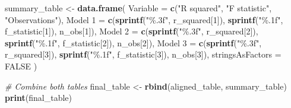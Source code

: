 \documentclass[
]{article}
\newenvironment{Shaded}{\begin{snugshade}}{\end{snugshade}}
\newcommand{\AttributeTok}[1]{\textcolor[rgb]{0.13,0.29,0.53}{#1}}
\newcommand{\CommentTok}[1]{\textcolor[rgb]{0.56,0.35,0.01}{\textit{#1}}}
\newcommand{\ConstantTok}[1]{\textcolor[rgb]{0.56,0.35,0.01}{#1}}
\newcommand{\DecValTok}[1]{\textcolor[rgb]{0.00,0.00,0.81}{#1}}
\newcommand{\FunctionTok}[1]{\textcolor[rgb]{0.13,0.29,0.53}{\textbf{#1}}}
\newcommand{\NormalTok}[1]{#1}
\newcommand{\OtherTok}[1]{\textcolor[rgb]{0.56,0.35,0.01}{#1}}
\newcommand{\StringTok}[1]{\textcolor[rgb]{0.31,0.60,0.02}{#1}}
\begin{document}
\begin{Shaded}
\begin{Highlighting}[]
\NormalTok{summary\_table }\OtherTok{\textless{}{-}} \FunctionTok{data.frame}\NormalTok{(}
  \AttributeTok{Variable =} \FunctionTok{c}\NormalTok{(}\StringTok{"R squared"}\NormalTok{, }\StringTok{"F statistic"}\NormalTok{, }\StringTok{"Observations"}\NormalTok{),}
  \StringTok{\textasciigrave{}}\AttributeTok{Model 1}\StringTok{\textasciigrave{}} \OtherTok{=} \FunctionTok{c}\NormalTok{(}\FunctionTok{sprintf}\NormalTok{(}\StringTok{"\%.3f"}\NormalTok{, r\_squared[}\DecValTok{1}\NormalTok{]), }\FunctionTok{sprintf}\NormalTok{(}\StringTok{"\%.1f"}\NormalTok{, f\_statistic[}\DecValTok{1}\NormalTok{]), n\_obs[}\DecValTok{1}\NormalTok{]),}
  \StringTok{\textasciigrave{}}\AttributeTok{Model 2}\StringTok{\textasciigrave{}} \OtherTok{=} \FunctionTok{c}\NormalTok{(}\FunctionTok{sprintf}\NormalTok{(}\StringTok{"\%.3f"}\NormalTok{, r\_squared[}\DecValTok{2}\NormalTok{]), }\FunctionTok{sprintf}\NormalTok{(}\StringTok{"\%.1f"}\NormalTok{, f\_statistic[}\DecValTok{2}\NormalTok{]), n\_obs[}\DecValTok{2}\NormalTok{]),}
  \StringTok{\textasciigrave{}}\AttributeTok{Model 3}\StringTok{\textasciigrave{}} \OtherTok{=} \FunctionTok{c}\NormalTok{(}\FunctionTok{sprintf}\NormalTok{(}\StringTok{"\%.3f"}\NormalTok{, r\_squared[}\DecValTok{3}\NormalTok{]), }\FunctionTok{sprintf}\NormalTok{(}\StringTok{"\%.1f"}\NormalTok{, f\_statistic[}\DecValTok{3}\NormalTok{]), n\_obs[}\DecValTok{3}\NormalTok{]),}
  \AttributeTok{stringsAsFactors =} \ConstantTok{FALSE}
\NormalTok{)}

\CommentTok{\# Combine both tables}
\NormalTok{final\_table }\OtherTok{\textless{}{-}} \FunctionTok{rbind}\NormalTok{(aligned\_table, summary\_table)}
\FunctionTok{print}\NormalTok{(final\_table)}
\end{Highlighting}
\end{Shaded}
\end{document}
